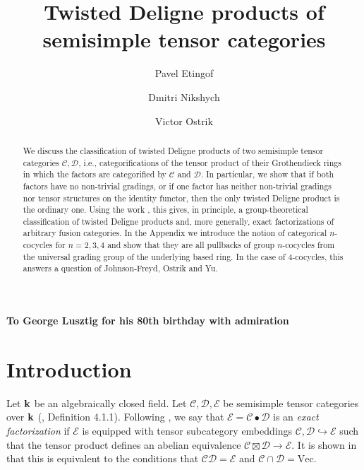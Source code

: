 \documentclass[12pt]{amsart}
\numberwithin{equation}{section}
\theoremstyle{definition}
\newcommand{\1}{_{(1)}}
\newcommand{\2}{_{(2)}}
\newcommand{\3}{_{(3)}}
\newcommand{\4}{_{(4)}}
\newcommand{\5}{_{(5)}}
\newcommand{\6}{_{(6)}}
\newcommand{\C}{\mathcal{C}}
\theoremstyle{plain}
\theoremstyle{definition}
\theoremstyle{remark}
\def\C{\mathcal{C}}
\def\D{\mathcal{D}}
\def\E{\mathcal{E}}
\def\Vec{\mathrm{Vec}}
\begin{document}
\title{Twisted Deligne products of semisimple tensor categories}
\author{Pavel Etingof}
\address{Department of Mathematics
Massachusetts Institute of Technology
 Massachusetts Avenue,
Cambridge, MA 02139,
USA
}


\author{Dmitri Nikshych}
\address{Department of Mathematics
University of New Hampshire
\newline Durham, NH 03824}

\author{Victor Ostrik}
\address{Department of Mathematics, 
University of Oregon
\newline
Eugene, OR 97403
}

\begin{abstract}
 We discuss the classification of twisted Deligne products of two semisimple tensor categories $\C,\D$, i.e., categorifications of the tensor product of their Grothendieck rings in which the factors
are categorified by $\C$ and $\D$. In particular, we show that if  both factors have no non-trivial gradings, or if one factor has neither non-trivial gradings nor tensor structures on the identity functor, then the only twisted Deligne product is the ordinary one. Using the work \cite{MPP}, this gives, in principle, a group-theoretical classification of twisted Deligne products and, more generally, exact factorizations of arbitrary fusion categories. In the Appendix we introduce the notion of categorical $n$-cocycles for $n=2,3,4$ and show that they are all pullbacks of group $n$-cocycles from the universal grading group of the underlying based ring. In the case of $4$-cocycles, this answers a question of Johnson-Freyd, Ostrik and Yu. 
\end{abstract} 

\maketitle

\centerline{\bf To George Lusztig for his 80th birthday with admiration}

\tableofcontents

\section{Introduction} 

Let $\bold k$ be an algebraically closed field. 
Let $\C,\D,\E$ be semisimple tensor categories over $\bold k$ (\cite{EGNO}, Definition 4.1.1).
Following \cite{G}, 
we say that $\E=\C\bullet \D$ is an {\it exact factorization} if $\E$ is equipped with tensor subcategory embeddings $\C,\D\hookrightarrow \E$ such that the tensor product defines an abelian equivalence $\C\boxtimes \D\to \E$. It is shown in \cite{G} that this is equivalent to the conditions that $\C\D=\E$ and $\C\cap \D=\Vec$.
\end{document}
